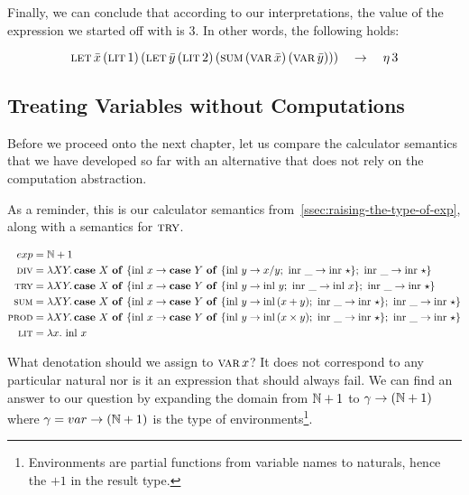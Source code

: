Finally, we can conclude that according to our interpretations, the
value of the expression we started off with is $3$. In other words, the
following holds:

$$
\letecn{x}{\litec{1}}{\letec{y}{\litec{2}}{\sumec{\varec{x}}{\varec{y}}}}
\quad \to \quad
\ap{\eta}{3}
$$


\subsection{Treating Variables without Computations}

Before we proceed onto the next chapter, let us compare the calculator
semantics that we have developed so far with an alternative that does not
rely on the computation abstraction.

As a reminder, this is our calculator semantics
from~\ref{ssec:raising-the-type-of-exp}, along with a semantics for
$\trye$.

\begin{align*}
  exp &= \NN + 1 \\
  \dive &= \lam{X Y}{\case{X}{x}{\case{Y}{y}{x / y}{\_}{\ap{\inr}{\star}}}{\_}{\ap{\inr}{\star}}} \\ 
  \trye &= \lam{X Y}{\case{X}{x}{\case{Y}{y}{\ap{\inl}{y}}{\_}{\ap{\inl}{x}}}{\_}{\ap{\inr}{\star}}} \\ 
  \sume &= \lam{X Y}{\case{X}{x}{\case{Y}{y}{\ap{\inl}{(x + y)}}{\_}{\ap{\inr}{\star}}}{\_}{\ap{\inr}{\star}}} \\ 
  \prode &= \lam{X Y}{\case{X}{x}{\case{Y}{y}{\ap{\inl}{(x \times y)}}{\_}{\ap{\inr}{\star}}}{\_}{\ap{\inr}{\star}}} \\ 
  \lite &= \lam{x}{\ap{\inl}{x}}
\end{align*}

What denotation should we assign to $\varecn{x}$? It does not correspond to
any particular natural nor is it an expression that should always fail. We
can find an answer to our question by expanding the domain from $\NN + 1$
to $\gamma \to (\NN + 1)$ where $\gamma = var \to (\NN + 1)$ is the type of
environments\footnote{Environments are partial functions from variable
  names to naturals, hence the $+ 1$ in the result type.}.

